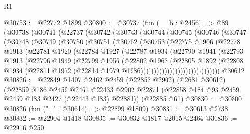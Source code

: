 \begin{lexlean}{R1}
\begin{coremodule}
@30753 := @22772 @1899
@30800 := @30737
    (fun (__b : @2456) =>
    @89
      (@30738
        (@30741
          (@22737
            (@30742
              (@30743
                (@30744
                  (@30745
                    (@30746
                      (@30747
                        (@30748
                          (@30749
                            (@30750
                              (@30751
                                (@30752
                                  (@30753
                                    (@22775
                                      @1906
                                      (@22778
                                        @1913
                                        (@22781
                                          @1920
                                          (@22784
                                            @1927
                                            (@22787
                                              @1934
                                              (@22790
                                                @1941
                                                (@22793
                                                  @1913
                                                  (@22796
                                                    @1949
                                                    (@22799
                                                      @1956
                                                      (@22802
                                                        @1963
                                                        (@22805
                                                          @1892
                                                          (@22808
                                                            @1934
                                                            (@22811
                                                              @1972
                                                              (@22814
                                                                @1979
                                                                @1986))))))))))))))))))))))))))))))
    @30612
@30826 := @22849
    @1407
    @2462
    @2459
    (@22853 @2902)
    (@2681 @30612)
    (@22859
      @186
      @2459
      @2461
      @22433
      @2902
      @22871
      (@22858 @184 @93 @2459 @2459 @183 @2427 (@22443 @183) @22881))
    (@22885 @61)
@30830 := @30800 @30826 (fun ("_" : @30614) => @22899 @1809)
@30831 := @30613 @2738
@30832 := @22904 @1418
@30835 := @30832 @1817 @2015 @2464
@30836 := @22916 @250

\end{coremodule}
\end{lexlean}
